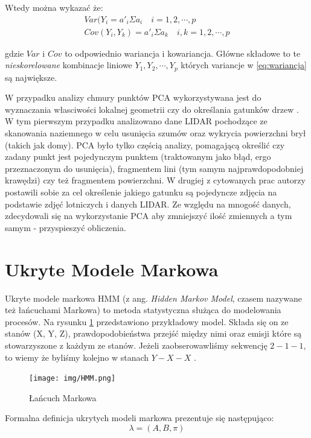 Wtedy można wykazać że:
\begin{align}
    Var(Y_{i} = a'_{i}\Sigma a_{i} \quad i = 1,2, \cdots, p 
    \label{eq:wariancja} \\
    Cov(Y_{i}, Y_{k}) = a'_{i} \Sigma a_{k} \quad i,k = 1,2, \cdots, p
\end{align}

gdzie $Var$ i $Cov$ to odpowiednio wariancja i kowariancja. Główne składowe to te \textit{nieskorelowane} kombinacje liniowe $Y_{1}, Y_{2}, \cdots, Y_{p}$ których variancje w \ref{eq:wariancja} są
największe.

W przypadku analizy chmury punktów PCA wykorzystywana jest do wyznaczania własciwości lokalnej geometrii \cite{natale2010} czy do określania gatunków drzew \cite{lee2016}.
W tym pierwszym przypadku analizowano dane LIDAR pochodzące ze skanowania naziemnego w celu usunięcia szumów oraz wykrycia powierzchni brył (takich jak domy).
PCA było tylko częścią analizy, pomagającą określić czy zadany punkt jest pojedynczym punktem (traktowanym jako błąd, ergo przeznaczonym do usunięcia), fragmentem lini (tym samym najprawdopodobniej krawędzi)
czy też fragmentem powierzchni.
W drugiej z cytowanych prac autorzy postawili sobie za cel określenie jakiego gatunku są pojedyncze zdjęcia na podstawie zdjęć lotniczych i danych LIDAR.
Ze względu na mnogość danych, zdecydowali się na wykorzystanie PCA aby zmniejszyć ilość zmiennych a tym samym - przyspieszyć obliczenia.

\section{Ukryte Modele Markowa}

Ukryte modele markowa HMM (z ang. \textit{Hidden Markov Model}, czasem nazywane też łańcuchami Markowa) to metoda statystyczna służąca do modelowania procesów.
Na rysunku \ref{fig:lancuch_markova} przedstawiono przykładowy model.
Składa się on ze stanów (X, Y, Z), prawdopodobieństwa przejść między nimi oraz emisji które są stowarzyszone z każdym ze stanów.
Jeżeli zaobserowawliśmy sekwencję $2-1-1$, to wiemy że byliśmy kolejno w stanach $Y-X-X$ \cite{blunsom2004}. 

\begin{figure}[h!]
    \centering
    \texttt{[image: img/HMM.png]}
    \caption{Łańcuch Markowa}
    \label{fig:lancuch_markova}
\end{figure}

\newpage

Formalna definicja ukrytych modeli markowa prezentuje się następująco:
\begin{equation}
    \lambda = (A,B,\pi)
\end{equation}

